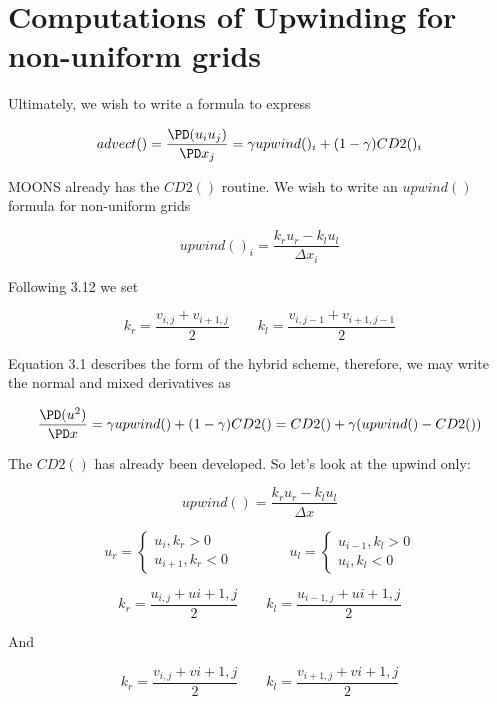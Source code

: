 \documentclass[11pt]{article}
\begin{document}
\doublespacing
\MOONSTITLE
\maketitle

\section{Computations of Upwinding for non-uniform grids}

Ultimately, we wish to write a formula to express

\begin{equation}
	advect() = \frac{\PD(u_i u_j)}{\PD x_j} = \gamma upwind()_i + (1-\gamma) CD2()_i
\end{equation}

MOONS already has the $CD2()$ routine. We wish to write an $upwind()$ formula for non-uniform grids

\begin{equation}
	upwind()_i = \frac{k_r u_r - k_l u_l}{\Delta x_i}
\end{equation}

Following 3.12 we set

\begin{equation}
	k_r = \frac{v_{i,j}+v_{i+1,j}}{2} \qquad
	k_l = \frac{v_{i,j-1}+v_{i+1,j-1}}{2}
\end{equation}

Equation 3.1 describes the form of the hybrid scheme, therefore, we may write the normal and mixed derivatives as

\begin{equation}
	\frac{\PD(u^2)}{\PD x} = \gamma upwind() + (1-\gamma) CD2()
	=
	CD2() + \gamma (upwind()-CD2())
\end{equation}

The $CD2()$ has already been developed. So let's look at the upwind only:

\begin{equation}
	upwind() = \frac{k_r u_r - k_l u_l}{\Delta x}
\end{equation}

\begin{equation}
	u_r =
	\begin{cases}
	u_i , k_r>0 \\
	u_{i+1} , k_r <0
	\end{cases}
	\qquad
	\qquad
	u_l =
	\begin{cases}
	u_{i-1} , k_l>0 \\
	u_{i} , k_l <0
	\end{cases}
\end{equation}

\begin{equation}
	k_r = \frac{u_{i,j}+u{i+1,j}}{2}
	\qquad
	k_l = \frac{u_{i-1,j}+u{i+1,j}}{2}
\end{equation}

And

\begin{equation}
	k_r = \frac{v_{i,j}+v{i+1,j}}{2}
	\qquad
	k_l = \frac{v_{i+1,j}+v{i+1,j}}{2}
\end{equation}
\end{document}
